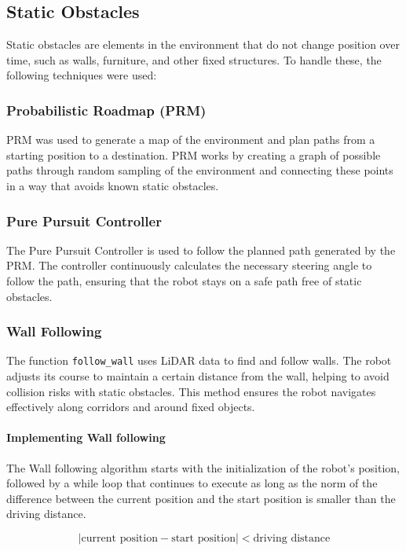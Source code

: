\documentclass{article}
\begin{document}
	\subsection{Static Obstacles}
	Static obstacles are elements in the environment that do not change position over time, such as walls, furniture, and other fixed structures. To handle these, the following techniques were used:
	
	\subsubsection{Probabilistic Roadmap (PRM)}
	PRM was used to generate a map of the environment and plan paths from a starting position to a destination. PRM works by creating a graph of possible paths through random sampling of the environment and connecting these points in a way that avoids known static obstacles.
	
	\subsubsection{Pure Pursuit Controller}
	The Pure Pursuit Controller is used to follow the planned path generated by the PRM. The controller continuously calculates the necessary steering angle to follow the path, ensuring that the robot stays on a safe path free of static obstacles.
	
	\subsubsection{Wall Following}
	The function \texttt{follow\_wall} uses LiDAR data to find and follow walls. The robot adjusts its course to maintain a certain distance from the wall, helping to avoid collision risks with static obstacles. This method ensures the robot navigates effectively along corridors and around fixed objects.
	
	\paragraph{Implementing Wall following}
	The Wall following algorithm starts with the initialization of the robot's position, followed by a while loop that continues to execute as long as the norm of the difference between the current position and the start position is smaller than the driving distance.
	
	\[
	|\text{current position} - \text{start position}| < \text{driving distance}
	\]
	
\end{document}
